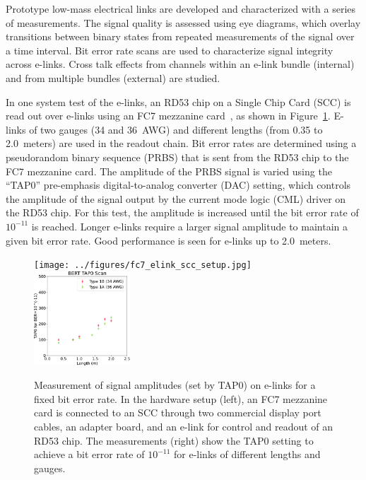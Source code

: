 \documentclass[a4paper,11pt]{article}
\newcommand{\fig}{Figure}
\begin{document}

Prototype low-mass electrical links are developed and characterized with a series of measurements.
The signal quality is assessed using eye diagrams, which overlay transitions between binary states from repeated measurements of the signal over a time interval.
Bit error rate scans are used to characterize signal integrity across e-links.
Cross talk effects from channels within an e-link bundle (internal) and from multiple bundles (external) are studied.


In one system test of the e-links, an RD53 chip on a Single Chip Card (SCC) is read out over e-links using an FC7 mezzanine card~\cite{ref:fc7}, as shown in \fig~\ref{fig:tap0_vs_length}.
E-links of two gauges (34 and 36~AWG) and different lengths (from 0.35 to 2.0~meters) are used in the readout chain.
Bit error rates are determined using a pseudorandom binary sequence (PRBS) that is sent from the RD53 chip to the FC7 mezzanine card.
The amplitude of the PRBS signal is varied using the ``TAP0'' pre-emphasis digital-to-analog converter (DAC) setting, which controls the amplitude of the signal output by the current mode logic (CML) driver on the RD53 chip.
For this test, the amplitude is increased until the bit error rate of $10^{-11}$ is reached.
Longer e-links require a larger signal amplitude to maintain a given bit error rate.
Good performance is seen for e-links up to 2.0~meters.

\begin{figure}[htbp]
\centering
\texttt{[image: ../figures/fc7\_elink\_scc\_setup.jpg]}
\qquad
\includegraphics[width=0.32\textwidth,origin=c]{../figures/BERT_TAP0_vs_Length-crop.pdf}
\caption{
\label{fig:tap0_vs_length}
Measurement of signal amplitudes (set by TAP0) on e-links for a fixed bit error rate.
In the hardware setup (left), an FC7 mezzanine card is connected to an SCC through two commercial display port cables, an adapter board, and an e-link for control and readout of an RD53 chip.
The measurements (right) show the TAP0 setting to achieve a bit error rate of $10^{-11}$ for e-links of different lengths and gauges.
}
\end{figure}
\end{document}
